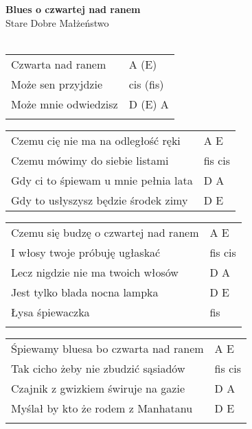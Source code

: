 \documentclass[a5paper]{article}
\begin{document}


\noindent
\fontsize{12pt}{15pt}\selectfont
\textbf{Blues o czwartej nad ranem} \\
\fontsize{8pt}{10pt}\selectfont
Stare Dobre Małżeństwo \\ \\
\fontsize{10pt}{12pt}\selectfont

\begin{tabular}{@{}p{7cm}p{3cm}@{}}
\noindent
Czwarta nad ranem & A (E) \\
Może sen przyjdzie & cis (fis) \\
Może mnie odwiedzisz & D (E) A \\ \\
\end{tabular}

\noindent
\begin{tabular}{@{}p{8cm}p{3cm}@{}}
Czemu cię nie ma na odległość ręki & A E \\
Czemu mówimy do siebie listami & fis cis \\
Gdy ci to śpiewam u mnie pełnia lata & D A \\
Gdy to usłyszysz będzie środek zimy & D E \\
\end{tabular}

\noindent
\begin{tabular}{@{}p{8cm}p{3cm}@{}}
Czemu się budzę o czwartej nad ranem & A E \\
I włosy twoje próbuję ugłaskać & fis cis \\
Lecz nigdzie nie ma twoich włosów & D A \\
Jest tylko blada nocna lampka & D E \\
Łysa śpiewaczka & fis \\ \\
\end{tabular}

\noindent
\begin{tabular}{@{}p{8cm}p{3cm}@{}}
Śpiewamy bluesa bo czwarta nad ranem & A E \\
Tak cicho żeby nie zbudzić sąsiadów & fis cis \\
Czajnik z gwizkiem świruje na gazie & D A \\
Myślał by kto że rodem z Manhatanu & D E \\ \\
\end{tabular}
\end{document}
